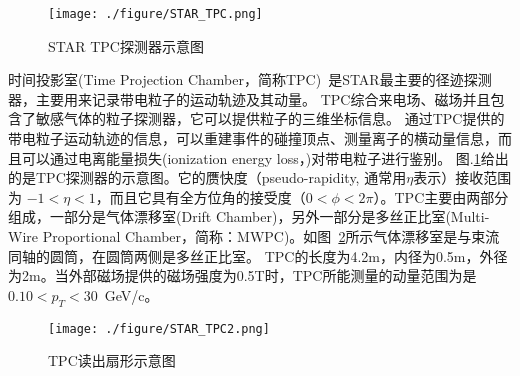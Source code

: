 \begin{figure}[htbp]
\centering
\texttt{[image: ./figure/STAR\_TPC.png]}
\caption[TPC探测器 ]{STAR TPC探测器示意图 \cite{anderson2003star}}
\label{Fig:STAR_TPC}
\end{figure}
时间投影室(Time Projection Chamber，简称TPC)~\cite{anderson2003star}是STAR最主要的径迹探测器，主要用来记录带电粒子的运动轨迹及其动量。
TPC综合来电场、磁场并且包含了敏感气体的粒子探测器，它可以提供粒子的三维坐标信息。
通过TPC提供的带电粒子运动轨迹的信息，可以重建事件的碰撞顶点、测量离子的横动量信息，而且可以通过电离能量损失(ionization energy loss，\dEdx)对带电粒子进行鉴别。
 图.\ref{Fig:STAR_TPC}给出的是TPC探测器的示意图。它的赝快度（pseudo-rapidity, 通常用$\eta$表示）接收范围为 $-1 < \eta <1$，而且它具有全方位角的接受度（$0<\phi<2\pi$）。TPC主要由两部分组成，一部分是气体漂移室(Drift Chamber)，另外一部分是多丝正比室(Multi-Wire Proportional Chamber，简称：MWPC)。如图~\ref{Fig:STAR_TPC2}所示气体漂移室是与束流同轴的圆筒，在圆筒两侧是多丝正比室。
TPC的长度为4.2m，内径为0.5m，外径为2m。当外部磁场提供的磁场强度为0.5T时，TPC所能测量的动量范围为是$0.10 <p_{T}<30$~GeV/c。

\begin{figure}[htbp]
\centering
\texttt{[image: ./figure/STAR\_TPC2.png]}
\caption{TPC读出扇形示意图 \cite{anderson2003star}}
\label{Fig:STAR_TPC2}
\end{figure}


